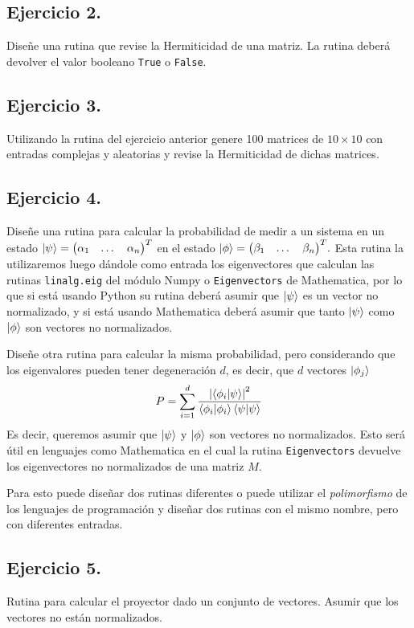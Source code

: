 \documentclass[11pt,letterpaper]{article}
\begin{document}
\subsection*{Ejercicio 2. }
Diseñe una rutina que revise la Hermiticidad de una matriz. La rutina
deberá devolver el valor booleano \verb|True| o \verb|False|.

\subsection*{Ejercicio 3.}
Utilizando la rutina del ejercicio anterior genere 100 matrices de $10\times10$
con entradas complejas y aleatorias y revise la Hermiticidad de dichas
matrices.

\subsection*{Ejercicio 4.}
Diseñe una rutina para calcular la probabilidad de medir a un sistema
en un estado 
$\ket{\psi}=\mqty(\alpha_1&\dots&\alpha_n)^T$
en el estado 
$\ket{\phi}=\mqty(\beta_1&\dots&\beta_n)^T.$
Esta rutina la utilizaremos luego dándole como entrada los eigenvectores que calculan las
rutinas \verb|linalg.eig| del módulo Numpy o \verb|Eigenvectors| de Mathematica, 
por lo que si está usando Python su rutina deberá asumir que $\ket{\psi}$
es un vector no normalizado, y si está usando Mathematica deberá 
asumir que tanto $\ket{\psi}$ como $\ket{\phi}$ son vectores no normalizados.

Diseñe otra rutina para calcular la misma probabilidad, pero considerando
que los eigenvalores pueden tener degeneración $d$, es decir, que $d$
vectores $\ket{\phi_{j}}$
\begin{align*}
P=\sum_{i=1}^d\frac{\abs{\braket{\phi_i}{\psi}}^2}{\braket{\phi_i}{\phi_i}\braket{\psi}{\psi}}
\end{align*}
Es decir, queremos asumir que $\ket{\psi}$ y $\ket{\phi}$ son vectores
no normalizados. Esto será útil en lenguajes como Mathematica en el cual
la rutina \verb|Eigenvectors| devuelve los eigenvectores no normalizados
de una matriz $M$.

Para esto puede diseñar dos rutinas diferentes o puede utilizar el 
\textit{polimorfismo} de los lenguajes de programación y diseñar 
dos rutinas con el mismo nombre, pero con diferentes entradas.

\subsection*{Ejercicio 5.}
Rutina para calcular el proyector dado un conjunto de vectores. 
Asumir que los vectores no están normalizados.
\end{document}
